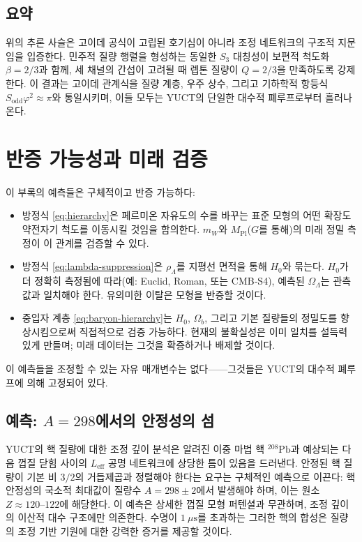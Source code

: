 \documentclass[11pt,a4paper]{article}
\theoremstyle{remark}
\begin{document}
	\subsection{요약}
	
	위의 추론 사슬은 고이데 공식이 고립된 호기심이 아니라 조정 네트워크의 구조적 지문임을 입증한다. 민주적 질량 행렬을 형성하는 동일한 \(S_3\) 대칭성이 보편적 척도화 \(\beta=2/3\)과 함께, 세 채널의 간섭이 고려될 때 렙톤 질량이 \(Q=2/3\)을 만족하도록 강제한다. 이 결과는 고이데 관계식을 질량 계층, 우주 상수, 그리고 기하학적 항등식 \(S_{\mathrm{odd}}\varphi^2 \approx \pi\)와 통일시키며, 이들 모두는 YUCT의 단일한 대수적 폐루프로부터 흘러나온다.
	
	
	\section{반증 가능성과 미래 검증}
	
	이 부록의 예측들은 구체적이고 반증 가능하다:
	\begin{itemize}
		\item 방정식 \eqref{eq:hierarchy}은 페르미온 자유도의 수를 바꾸는 표준 모형의 어떤 확장도 약전자기 척도를 이동시킬 것임을 함의한다. \(m_W\)와 \(M_{\mathrm{Pl}}\)(\(G\)를 통해)의 미래 정밀 측정이 이 관계를 검증할 수 있다.
		\item 방정식 \eqref{eq:lambda-suppression}은 \(\rho_\Lambda\)를 지평선 면적을 통해 \(H_0\)와 묶는다. \(H_0\)가 더 정확히 측정됨에 따라(예: Euclid, Roman, 또는 CMB‑S4), 예측된 \(\Omega_\Lambda\)는 관측값과 일치해야 한다. 유의미한 이탈은 모형을 반증할 것이다.
		\item 중입자 계층 \eqref{eq:baryon-hierarchy}는 \(H_0\), \(\Omega_b\), 그리고 기본 질량들의 정밀도를 향상시킴으로써 직접적으로 검증 가능하다. 현재의 불확실성은 이미 일치를 설득력 있게 만들며; 미래 데이터는 그것을 확증하거나 배제할 것이다.
	\end{itemize}
	이 예측들을 조정할 수 있는 자유 매개변수는 없다——그것들은 YUCT의 대수적 폐루프에 의해 고정되어 있다.
	
	\subsection{예측: \(A=298\)에서의 안정성의 섬}
	
	YUCT의 핵 질량에 대한 조정 깊이 분석은 알려진 이중 마법 핵 \(^{208}\mathrm{Pb}\)과 예상되는 다음 껍질 닫힘 사이의 \(L_{\mathrm{eff}}\) 공명 네트워크에 상당한 틈이 있음을 드러낸다. 안정된 핵 질량이 기본 비 \(3/2\)의 거듭제곱과 정렬해야 한다는 요구는 구체적인 예측으로 이끈다: 핵 안정성의 국소적 최대값이 질량수 \(A = 298 \pm 2\)에서 발생해야 하며, 이는 원소 \(Z \approx 120\)--\(122\)에 해당한다. 이 예측은 상세한 껍질 모형 퍼텐셜과 무관하며, 조정 깊이의 이산적 대수 구조에만 의존한다. 수명이 \(1\ \mu\text{s}\)를 초과하는 그러한 핵의 합성은 질량의 조정 기반 기원에 대한 강력한 증거를 제공할 것이다.
	
\end{document}
